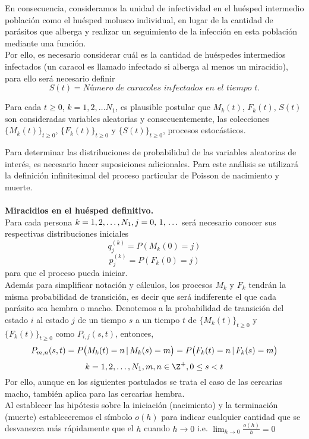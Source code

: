     En consecuencia, consideramos la unidad de infectividad en el huésped intermedio población como el huésped molusco individual, en lugar de la cantidad de parásitos que alberga y realizar un seguimiento de la infección en esta población mediante una función.\\
    Por ello, es necesario considerar cuál es la cantidad de huéspedes intermedios infectados (un caracol es llamado infectado si alberga al menos un miracidio), para ello será necesario definir $$S(t)= \textit{Número de caracoles infectados en el tiempo $t$.}$$
\begin{Obs}
   Para cada $t\geq 0$, $k=1,2,\ldots N_1$, es plausible postular que $M_k(t)$, $F_k(t)$, $S(t)$ son consideradas variables aleatorias y consecuentemente, las colecciones $\{M_k(t)\}_{t\geq 0}$, $\{F_k(t)\}_{t\geq 0}$ y $\{S(t)\}_{t\geq 0}$, procesos estocásticos.
\end{Obs}
Para determinar las distribuciones de probabilidad de las variables aleatorias de interés, es necesario hacer suposiciones adicionales.
Para este análisis se utilizará la definición infinitesimal del proceso particular de Poisson de nacimiento y muerte.\\ \\ 
 \textbf{Miracidios en el huésped definitivo.}\\
Para cada persona $k=1,2,\ldots,N_1, j=0,\thinspace 1,\thinspace\ldots$ será necesario conocer sus respectivas distribuciones iniciales $$q_j^{(k)}=P(M_k(0)=j)$$ $$p_j^{(k)}=P(F_k(0)=j)$$ para que el proceso pueda iniciar.\\
    Además para simplificar notación y cálculos, los procesos $M_k$ y $F_k$ tendrán la misma probabilidad de transición, es decir que será indiferente el que  cada parásito sea hembra o macho.
    Denotemos a la probabilidad de transición del estado $i$ al estado $j$ de un tiempo $s$ a un tiempo $t$ de $\{M_k(t)\}_{t\geq 0}$ y $\{F_k(t)\}_{t\geq 0}$ como $P_{i,j}(s,t)$, entonces, 
    $$P_{m,n}(s,t)=P\big(M_k(t)=n\thinspace|\thinspace M_k(s)=m\big)=P\big(F_k(t)=n\thinspace|\thinspace F_k(s)=m\big)$$
    $$k=1,2,\ldots,N_1, m,n\in\Z^+,0\leq s<t$$
    Por ello, aunque en los siguientes postulados se trata el caso de las cercarias macho, también aplica para las cercarias hembra.\\
    Al establecer las hipótesis sobre la iniciación (nacimiento) y la terminación (muerte)  estableceremos el símbolo $o(h)$ para indicar cualquier cantidad que se desvanezca más rápidamente que el $h$ cuando $h\rightarrow 0$ i.e. $\lim_{h\rightarrow 0}\frac{o(h)}{h}=0$\\
